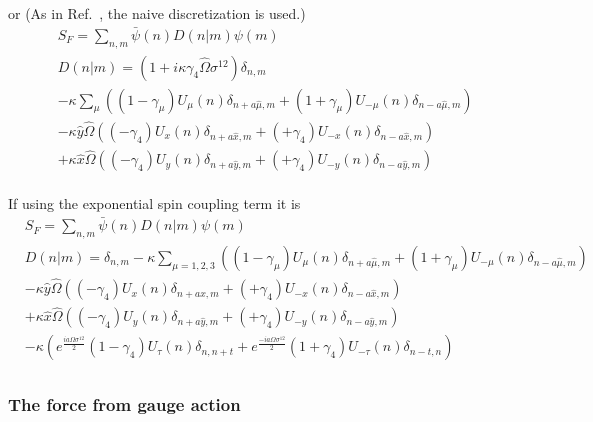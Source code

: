 or (As in Ref.~\cite{rotation}, the naive discretization is used.)
\textcolor[rgb]{0,0,0.8}{
\begin{equation}
\begin{split}
&S_F=\sum _{n,m}\bar{\psi }(n) D(n|m) \psi(m)\\
&D(n|m)=\left(1+i\kappa \gamma _4 \hat{\Omega} \sigma ^{12}\right)\delta _{n,m}\\
&-\kappa\sum _{\mu}\left((1-\gamma _{\mu})U_{\mu}(n)\delta _{n+a\hat{\mu},m}+(1+\gamma _{\mu})U_{-\mu}(n)\delta _{n-a\hat{\mu},m}\right)\\
&-\kappa \hat{y}\hat{\Omega} \left((-\gamma _4)U_{x}(n)\delta _{n+a\hat{x},m}+(+\gamma _4)U_{-x}(n)\delta _{n-a\hat{x},m}\right)\\
&+\kappa \hat{x}\hat{\Omega} \left((-\gamma _4)U_{y}(n)\delta _{n+a\hat{y},m}+(+\gamma _4)U_{-y}(n)\delta _{n-a\hat{y},m}\right)\\
\end{split}
\end{equation}
}

If using the exponential spin coupling term it is
\textcolor[rgb]{0,0,0.8}{
\begin{equation}
\begin{split}
&S_F=\sum _{n,m}\bar{\psi }(n) D(n|m) \psi(m)\\
&D(n|m)=\delta _{n,m}-\kappa\sum _{\mu = 1,2,3}\left((1-\gamma _{\mu})U_{\mu}(n)\delta _{n+a\hat{\mu},m}+(1+\gamma _{\mu})U_{-\mu}(n)\delta _{n-a\hat{\mu},m}\right)\\
&-\kappa \hat{y}\hat{\Omega} \left((-\gamma _4)U_{x}(n)\delta _{n+a\hat{x},m}+(+\gamma _4)U_{-x}(n)\delta _{n-a\hat{x},m}\right)\\
&+\kappa \hat{x}\hat{\Omega} \left((-\gamma _4)U_{y}(n)\delta _{n+a\hat{y},m}+(+\gamma _4)U_{-y}(n)\delta _{n-a\hat{y},m}\right)\\
&-\kappa \left(e^{\frac{ia\Omega \sigma ^{12}}{2}}(1-\gamma _4)U_{\tau}(n)\delta _{n,n+t} +e^{\frac{-ia\Omega \sigma ^{12}}{2}}(1+\gamma _4) U_{-\tau}(n)\delta _{n-t,n}\right)\\
\end{split}
\end{equation}
}


\subsubsection{\label{sec:ForceFromGaugeAction}The force from gauge action}

